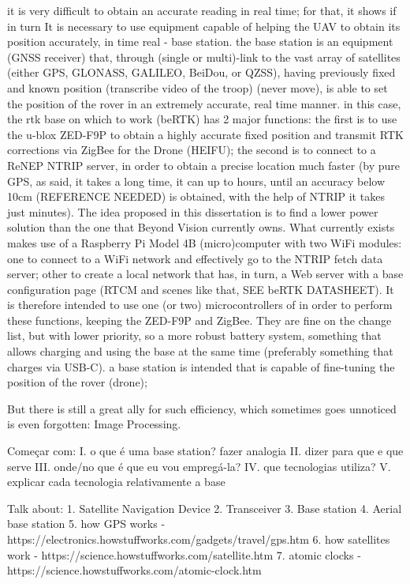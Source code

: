 it is very difficult to obtain an accurate reading in real time;
for that, it shows if in turn It is necessary to use equipment capable of helping the UAV to obtain its position accurately, in time real - base station. the base station is an equipment (GNSS receiver) that, through (single or multi)-link to the vast array of satellites (either GPS, GLONASS, GALILEO, BeiDou, or QZSS),
having previously fixed and known position (transcribe video of the troop) (never move), is able to set the position of the rover in an extremely accurate, real time manner.
in this case, the rtk base on which to work (beRTK) has 2 major functions: the first is to use the u-blox ZED-F9P to obtain a highly accurate fixed position and transmit RTK corrections via ZigBee for the Drone (HEIFU);
the second is to connect to a ReNEP NTRIP server, in order to obtain a precise location much faster (by pure GPS, as said, it takes a long time, it can up to hours, until an accuracy below 10cm (REFERENCE NEEDED) is obtained, with the help of NTRIP it takes just minutes).
The idea proposed in this dissertation is to find a lower power solution than the one that Beyond Vision currently owns. What currently exists makes use of a Raspberry Pi Model 4B (micro)computer with two WiFi modules:
one to connect to a WiFi network and effectively go to the NTRIP fetch data server;
other to create a local network that has, in turn, a Web server with a base configuration page (RTCM and scenes like that, SEE beRTK DATASHEET). It is therefore intended to use one (or two) microcontrollers of in order to perform these functions, keeping the ZED-F9P and ZigBee.
They are fine on the change list, but with lower priority, so a more robust battery system, something that allows charging and using the base at the same time (preferably something that charges via USB-C).
a base station is intended that is capable of fine-tuning the position of the rover (drone);

But there is still a great ally for such efficiency, which sometimes goes unnoticed is even forgotten: Image Processing.

Começar com:
I. o que é uma base station? fazer analogia
II. dizer para que e que serve
III. onde/no que é que eu vou empregá-la?
IV. que tecnologias utiliza?
V. explicar cada tecnologia relativamente a base

Talk about:
    1. Satellite Navigation Device
    2. Transceiver
    3. Base station
    4. Aerial base station
    5. how GPS works - https://electronics.howstuffworks.com/gadgets/travel/gps.htm
    6. how satellites work - https://science.howstuffworks.com/satellite.htm
    7. atomic clocks - https://science.howstuffworks.com/atomic-clock.htm

